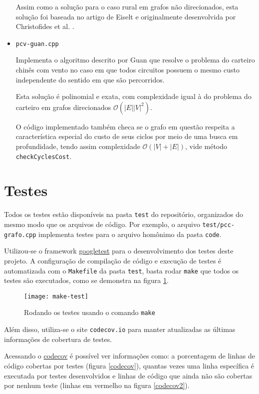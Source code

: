 \begin{itemize}
        Assim como a solução para o caso rural em grafos não direcionados, esta solução foi baseada no artigo de Eiselt \cite{michel} e originalmente desenvolvida por Christofides et al. \cite{christofides-86}.
            
    \item \texttt{pcv-guan.cpp}

        Implementa o algoritmo descrito por Guan \cite{guan-windy} que resolve o problema do carteiro chinês com vento no caso em que todos circuitos possuem o mesmo custo independente do sentido em que são percorridos.
        
        Esta solução é polinomial e exata, com complexidade igual à do problema do carteiro em grafos direcionados $\mathcal{O}(|E||V|^2)$.
        
        O código implementado também checa se o grafo em questão respeita a característica especial do custo de seus ciclos por meio de uma busca em profundidade, tendo assim complexidade $\mathcal{O}(|V| + |E|)$, vide método \texttt{checkCyclesCost}.

\end{itemize}

\section{Testes}

Todos os testes estão disponíveis na pasta \texttt{test} do repositório, organizados do mesmo modo que os arquivos de código.
Por exemplo, o arquivo \texttt{test/pcc-grafo.cpp} implementa testes para o arquivo homônimo da pasta \texttt{code}.


Utilizou-se o framework \href{https://github.com/google/googletest}{googletest} para o desenvolvimento dos testes deste projeto.
A configuração de compilação de código e execução de testes é automatizada com o \texttt{Makefile} da pasta \texttt{test}, basta rodar \texttt{make} que todos os testes são executados, como se demonstra na figura \ref{maketest}.

\begin{figure}[ht]
    \centering
    \texttt{[image: make-test]}
    \caption{Rodando os testes usando o comando \texttt{make}}
    \label{maketest}
\end{figure}

Além disso, utiliza-se o site \texttt{codecov.io} para manter atualizadas as últimas informações de cobertura de testes.

Acessando o \href{https://codecov.io/gh/gafeol/chinese-postman}{codecov} é possível ver informações como: a porcentagem de linhas de código cobertas por testes (figura \ref{codecov}), quantas vezes uma linha específica é executada por testes desenvolvidos e linhas de código que ainda não são cobertas por nenhum teste (linhas em vermelho na figura \ref{codecov2}).

